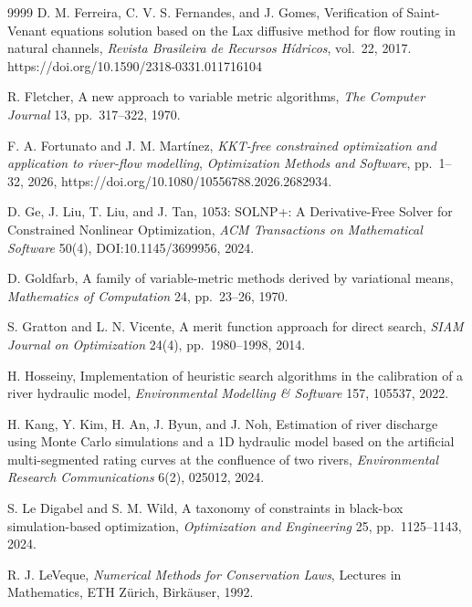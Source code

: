 \documentclass{article}
\begin{document}
\begin{thebibliography}{9999}
 D. M. Ferreira, C. V. S. Fernandes, and J. Gomes, Verification of Saint-Venant equations solution based 
on the Lax diffusive method for flow routing in natural channels, {\it Revista Brasileira de Recursos Hídricos}, vol.~22, 2017.
             https://doi.org/10.1590/2318-0331.011716104 

 R. Fletcher, A new approach to variable metric algorithms, {\it The
 Computer Journal} 13, pp.~317--322, 1970.

F. A. Fortunato and J. M. Mart\'inez, \emph{KKT-free constrained
	optimization and application to river-flow modelling}, {\it Optimization
	Methods and Software}, pp.~1--32, 2026, https://doi.org/10.1080/10556788.2026.2682934.

 D. Ge, J. Liu, T. Liu, and J. Tan, 
 1053: SOLNP+: A Derivative-Free Solver for Constrained Nonlinear Optimization, 
   {\it ACM Transactions on Mathematical Software} 50(4),  DOI:10.1145/3699956, 2024.         

 D. Goldfarb, A family of variable-metric methods derived by variational
 means, {\it Mathematics of Computation} 24, pp.~23--26, 1970.

 S. Gratton and L. N. Vicente, A merit function approach for direct
 search, {\it SIAM Journal on Optimization} 24(4), pp.~1980--1998, 2014.


 H. Hosseiny, Implementation of heuristic search algorithms in the calibration
 of a river hydraulic model, {\it Environmental Modelling \& Software} 157, 105537, 2022.

 H. Kang, Y. Kim, H. An, J. Byun, and J. Noh, Estimation of river discharge using
 Monte Carlo simulations and a 1D hydraulic model based on the artificial multi-segmented rating
 curves at the confluence of two rivers, {\it Environmental Research Communications} 6(2), 025012, 2024.

 S. Le Digabel and S. M. Wild, A taxonomy of constraints in black-box
 simulation-based optimization, {\it Optimization and Engineering} 25, pp.~1125--1143, 2024.

 R. J. LeVeque, \textit{Numerical Methods for
Conservation Laws}, Lectures in Mathematics, ETH Z\"urich,
Birk\"auser, 1992.


\end{thebibliography}
\end{document}
